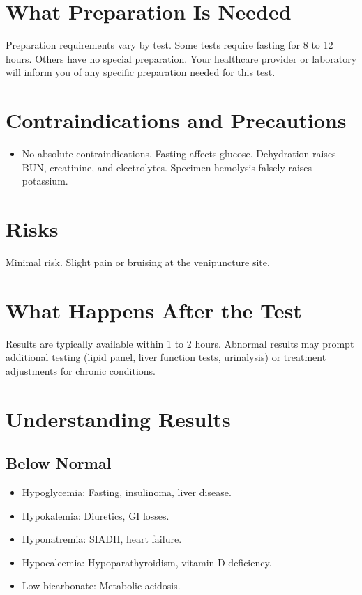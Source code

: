 \section*{What Preparation Is Needed}
Preparation requirements vary by test. Some tests require fasting for 8 to 12 hours. Others have no special preparation. Your healthcare provider or laboratory will inform you of any specific preparation needed for this test.

\section*{Contraindications and Precautions}
\begin{itemize}
  \item No absolute contraindications. Fasting affects glucose. Dehydration raises BUN, creatinine, and electrolytes. Specimen hemolysis falsely raises potassium.
\end{itemize}
\section*{Risks}
Minimal risk. Slight pain or bruising at the venipuncture site.

\section*{What Happens After the Test}
Results are typically available within 1 to 2 hours. Abnormal results may prompt additional testing (lipid panel, liver function tests, urinalysis) or treatment adjustments for chronic conditions.

\section*{Understanding Results}

\subsection*{Below Normal}
\begin{itemize}
  \item Hypoglycemia: Fasting, insulinoma, liver disease.
  \item Hypokalemia: Diuretics, GI losses.
  \item Hyponatremia: SIADH, heart failure.
  \item Hypocalcemia: Hypoparathyroidism, vitamin D deficiency.
  \item Low bicarbonate: Metabolic acidosis.
\end{itemize}

